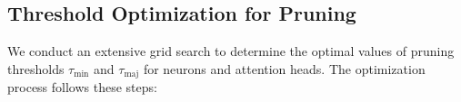 \begin{comment}
\subsection{Specific Model (Robustness Test for B and W)}
\label{app-bw}
\begin{enumerate}
    \item We choose purchase as the main scenario to evaluate because it shows the largest disparity (maybe some other reasons or just no reason)
    \item We come up with 30 variations (i.e. products to purchase) with the help of LLMs and manual inspection
    \item We run the 30 variations through Llama3-instruct to get the model's initial disparities and pick the 10 $V_p$ with the largest disparities

\end{enumerate}

\begin{enumerate}

    \item For each variation $v$, we first determine the grid search range by varying $b$ and $w$ and tracking the size of $f(b,w,v)$. We pick the $b$ and $w$ at the elbow points [DEFINE] where the size stops decreasing rapidly. We found that it's roughly when $b=w$. Thus we pick $b\in\{i|0 \leq i \leq 50, i\equiv0\pmod5\}$, and for each picked $b$, we pick $w\in\{i|0 \leq i \leq b, i\equiv0\pmod5\}$

    \item Then we prune the model with respective $b$ and $w$ combinations and got the 66 results. We analyze the disparity and utility of each result.
    \begin{enumerate}
        \item Utility is defined as the fraction of prices outside the range of the initial model's output
    \end{enumerate}
\end{enumerate}
\end{comment}

\subsection{Threshold Optimization for Pruning}
\label{app-bw}

We conduct an extensive grid search to determine the optimal values of pruning thresholds $\tau_{\text{min}}$ and $\tau_{\text{maj}}$ for neurons and attention heads. The optimization process follows these steps:

